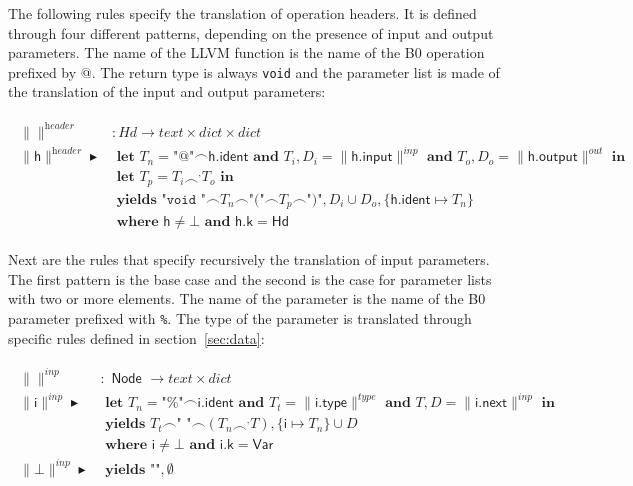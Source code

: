 \documentclass{article}
\newcommand{\trad}[2]{\ensuremath{\lVert \textsf{#1} \rVert^{\textit{#2}}}}
\newcommand{\mty}[0]{\texttt{""}}
\DeclareMathOperator{\conc}{\smallfrown}
\DeclareMathOperator{\isdef}{\blacktriangleright}
\begin{document}
The following rules specify the translation of operation headers. It
is defined through four different patterns, depending on the presence
of input and output parameters. The name of the LLVM function is the
name of the B0 operation prefixed by \mbox{@}. The return type is
always \texttt{void} and the parameter list is made of the translation
of the input and output parameters:

\begin{framed}
  \begin{align}
\begin{split}
    \trad{}{header} &: Hd \rightarrow text \times dict \times dict \\
    \trad{h}{header} \isdef& \textbf{ let } T_n = \textsf{"@"} \conc \textsf{h.ident} 
    \textbf{ and } T_i, D_i = \trad{h.input}{inp} 
    \textbf{ and } T_o, D_o = \trad{h.output}{out} \textbf{ in}  \\
    & \textbf{ let } T_p = T_i \conc^, T_o \textbf{ in}  \\
    & \textbf{ yields } \texttt{"void "} \conc T_n \conc \texttt{"("} \conc T_p \conc
    \texttt{")"}, D_i \cup D_o, \{ \textsf{h.ident} \mapsto T_n \}  \\
    & \textbf{ where } \textsf{h} \ne \bot \textbf{ and } \textsf{h.k} = \textsf{Hd} 
  \end{split}
\end{align}
\end{framed}

Next are the rules that specify recursively the translation of input
parameters. The first pattern is the base case and the second is the
case for parameter lists with two or more elements. The name of the
parameter is the name of the B0 parameter prefixed with \texttt{\%}.
The type of the parameter is translated through specific rules 
defined in section~\ref{sec:data}:

\begin{framed}
  \begin{align}
\begin{split}
    \trad{}{inp} &: \textsf{ Node } \rightarrow text \times dict \\
    \trad{i}{inp} \isdef& \textbf{ let } T_n = \textsf{"\%"} \conc \textsf{i.ident} 
    \textbf{ and } T_t = \trad{i.type}{type} 
    \textbf{ and } T, D = \trad{i.next}{inp} \textbf{ in}  \\
    & \textbf{ yields } T_t \conc \texttt{" "} \conc (T_n \conc^, T), \{ \textsf{i} \mapsto T_n \} \cup D  \\
    & \textbf{ where } \textsf{i} \ne \bot \textbf{ and } \textsf{i.k} = \textsf{Var}  \\
    \trad{$\bot$}{inp} \isdef& \textbf{ yields } \mty, \emptyset 
  \end{split}
\end{align}
\end{framed}
\end{document}
